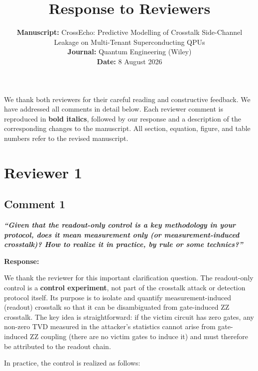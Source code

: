 \documentclass[11pt,a4paper]{article}
\title{Response to Reviewers}
\author{
    \textbf{Manuscript:} CrossEcho: Predictive Modelling of Crosstalk Side-Channel\\
    Leakage on Multi-Tenant Superconducting QPUs\\[4pt]
    \textbf{Journal:} Quantum Engineering (Wiley)\\[4pt]
    \textbf{Date:} 8 August 2026
}
\date{}
\begin{document}
\maketitle

\noindent
We thank both reviewers for their careful reading and constructive feedback. We have
addressed all comments in detail below. Each reviewer comment is reproduced in
\textbf{bold italics}, followed by our response and a description of the corresponding
changes to the manuscript. All section, equation, figure, and table numbers refer to
the revised manuscript.

\section*{Reviewer 1}

\subsection*{Comment 1}

\noindent\textbf{\textit{``Given that the readout-only control is a key methodology in your protocol,
does it mean measurement only (or measurement-induced crosstalk)? How to realize it
in practice, by rule or some technics?''}}

\medskip\noindent\textbf{Response:}

We thank the reviewer for this important clarification question. The readout-only control
is a \textbf{control experiment}, not part of the crosstalk attack or detection protocol
itself. Its purpose is to isolate and quantify measurement-induced (readout) crosstalk so
that it can be disambiguated from gate-induced ZZ crosstalk. The key idea is
straightforward: if the victim circuit has zero gates, any non-zero TVD measured in the
attacker's statistics cannot arise from gate-induced ZZ coupling (there are no victim gates
to induce it) and must therefore be attributed to the readout chain.

In practice, the control is realized as follows:
\end{document}
